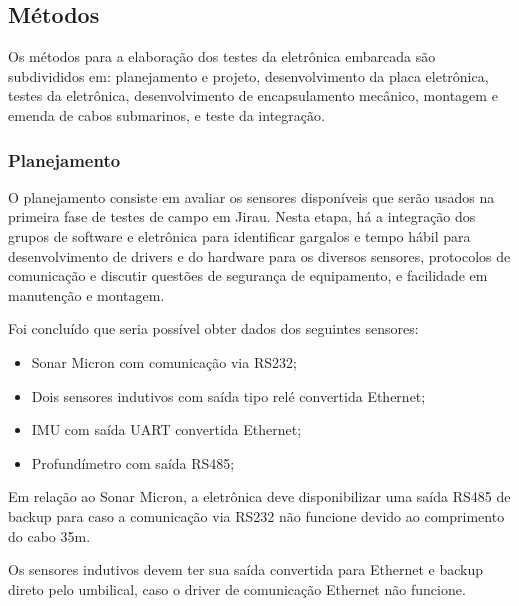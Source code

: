 


\subsection{Métodos}
Os métodos para a elaboração dos testes da eletrônica embarcada são subdivididos
em: planejamento e projeto, desenvolvimento da placa eletrônica, testes da
eletrônica, desenvolvimento de encapsulamento mecânico, montagem e emenda de
cabos submarinos, e teste da integração.

\subsubsection{Planejamento}
O planejamento consiste em avaliar os sensores disponíveis que serão usados na
primeira fase de testes de campo em Jirau. Nesta etapa, há a integração dos
grupos de software e eletrônica para identificar gargalos e tempo hábil para
desenvolvimento de drivers e do hardware para os diversos sensores, protocolos
de comunicação e discutir questões de segurança de equipamento, e facilidade em
manutenção e montagem.

Foi concluído que seria possível obter dados dos seguintes sensores: 
\begin{itemize}
  \item Sonar Micron com comunicação via RS232;
  \item Dois sensores indutivos com saída tipo relé convertida Ethernet;
  \item IMU com saída UART convertida Ethernet;
  \item Profundímetro com saída RS485;
\end{itemize}
Em relação ao Sonar Micron, a eletrônica deve disponibilizar uma saída RS485
de backup para caso a comunicação via RS232 não funcione devido ao comprimento
do cabo 35m.

Os sensores indutivos devem ter sua saída convertida para Ethernet e
backup direto pelo umbilical, caso o driver de comunicação Ethernet não
funcione.

